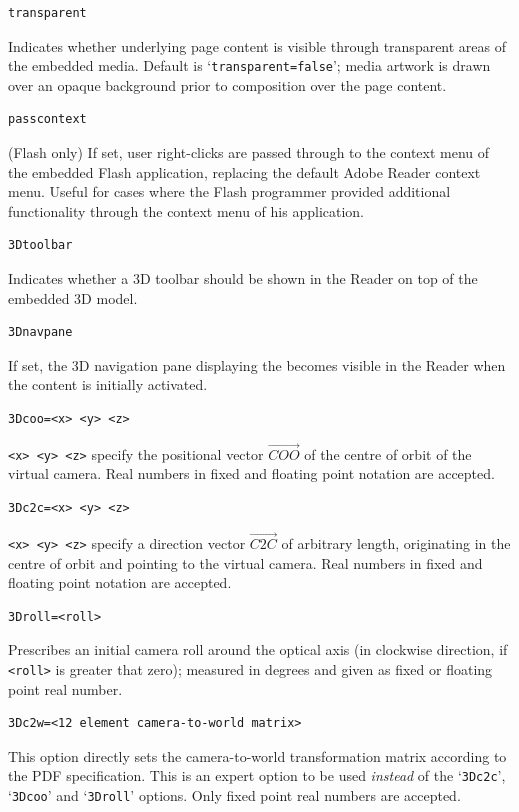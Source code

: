 \documentclass[a4paper]{article}
\begin{document}
\begin{verbatim}
transparent
\end{verbatim}
Indicates whether underlying page content is visible through transparent areas of the embedded media. Default is `\verb+transparent=false+'; media artwork is drawn over an opaque background prior to composition over the page content.
\begin{verbatim}
passcontext
\end{verbatim}
(Flash only) If set, user right-clicks are passed through to the context menu of the embedded Flash application, replacing the default Adobe Reader context menu. Useful for cases where the Flash programmer provided additional functionality through the context menu of his application.
\begin{verbatim}
3Dtoolbar
\end{verbatim}
Indicates whether a 3D toolbar should be shown in the Reader on top of the embedded 3D model.
\begin{verbatim}
3Dnavpane
\end{verbatim}
If set, the 3D navigation pane displaying the  becomes visible in the Reader when the content is initially activated.
\begin{verbatim}
3Dcoo=<x> <y> <z>
\end{verbatim}
\verb+<x> <y> <z>+ specify the positional vector $\overrightarrow{COO}$ of the centre of orbit of the virtual camera. Real numbers in fixed and floating point notation are accepted.
\begin{verbatim}
3Dc2c=<x> <y> <z>
\end{verbatim}
\verb+<x> <y> <z>+ specify a direction vector $\overrightarrow{C2C}$ of arbitrary length, originating in the centre of orbit and pointing to the virtual camera. Real numbers in fixed and floating point notation are accepted.
\begin{verbatim}
3Droll=<roll>
\end{verbatim}
Prescribes an initial camera roll around the optical axis (in clockwise direction, if \verb+<roll>+ is greater that zero); measured in degrees and given as fixed or floating point real number.
\begin{verbatim}
3Dc2w=<12 element camera-to-world matrix>
\end{verbatim}
This option directly sets the camera-to-world transformation matrix according to the PDF specification. This is an expert option to be used \emph{instead} of the `\verb+3Dc2c+', `\verb+3Dcoo+' and `\verb+3Droll+' options. Only fixed point real numbers are accepted.
\end{document}

